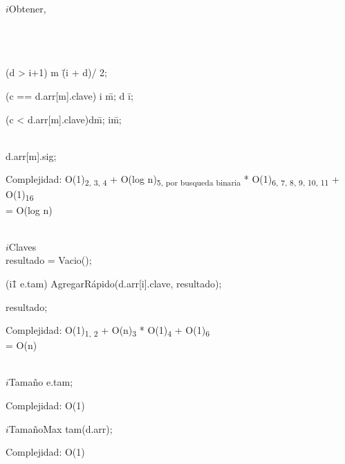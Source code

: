 	\begin{algorithm}{$i$Obtener}{, }{}
	\\
	\\
	\\
	\\
	\begin{WHILE}{(d > i+1)}
	m \= (i + d)/ 2;\\
	\begin{IF}{(c == d.arr[m].clave)}
		i \= m; d \= i;
	\ELSE \begin{IF}{(c < d.arr[m].clave)}d\=m;
	\ELSE i\=m;
	\end{IF}
	\end{IF}
	\end{WHILE}\\
	\RETURN d.arr[m].sig;
	\end{algorithm}
	Complejidad:  O(1)\textsubscript{2, 3, 4} + O(log n)\textsubscript{5, por busqueda binaria} * O(1)\textsubscript{6, 7, 8, 9, 10, 11} + O(1)\textsubscript{16}\\
	= O(log n)\\
	 \\
	
	\begin{algorithm}{$i$Claves}{}{}
	\\
	resultado = Vacio();\\
	\begin{FOR}{(i\=1 \TO e.tam)}
	AgregarRápido(d.arr[i].clave, resultado);
	\end{FOR}
	\RETURN resultado;
	\end{algorithm}
	Complejidad:  O(1)\textsubscript{1, 2} + O(n)\textsubscript{3} * O(1)\textsubscript{4} + O(1)\textsubscript{6}\\
	= O(n)\\
	 \\
	
	\begin{algorithm}{$i$Tama\~no}{}{}
	\RETURN e.tam;
	\end{algorithm}
	Complejidad:  O(1)

	\begin{algorithm}{$i$Tama\~noMax}{}{}
	\RETURN tam(d.arr);
	\end{algorithm}
	Complejidad: O(1)
	

\newpage
